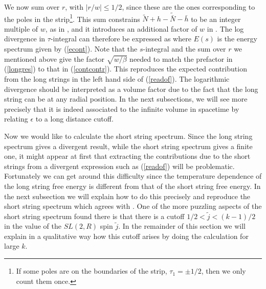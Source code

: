 We now sum over $r$, with $| r/w| \leq 1/2$, since these are the
ones corresponding to  the poles
in the strip\footnote{If some poles are on the boundaries of the strip,
  $\tau_1 = \pm 1/2$, then  we only
count them once. }. This sum constrains
$\tilde N+h- \tilde{\bar{N}}-\bar{h}$
  to be an integer  multiple of $w$, as in 
 \levelml , and  it introduces an additional factor
 of $w$ in \longres . The log divergence in
$\tau$-integral can therefore be expressed as
where $E(s)$ is the energy spectrum given by (\ref{econt}).
Note that the $s$-integral and the sum over $r$ we mentioned above 
 give the factor $\sqrt{w/\beta}$ needed
to match the prefactor
 in (\ref{longres}) to that 
in (\ref{contcontr}).   
This reproduces the expected contribution from the long strings 
in the left  hand side of
(\ref{readof}). The logarithmic divergence  should 
be interpreted as a volume factor due to the fact that the
long string can be at any radial position. In the next subsections, 
we will see more precisely that it is indeed associated to the 
infinite volume in spacetime by relating $\epsilon$ to a 
long distance cutoff.

 
Now we would like to calculate the short string spectrum.
Since the long string spectrum gives a divergent result, while the 
short string spectrum gives a finite one, it might appear at first that 
extracting the contributions due to the short strings from a divergent
expression such as (\ref{readof}) will be problematic.
Fortunately we can get around this difficulty since the
temperature dependence of the long string free energy is different
from that of the short string free energy.
In the next subsection we will explain how to do this precisely and 
reproduce the short string spectrum which agrees with 
\cite{Maldacena:2000hw}. One of the more
puzzling aspects of the short string spectrum found there is
that there is a cutoff $1/2 < \tilde{j} < (k-1)/2$
in the value of the $SL(2,R)$ spin $\tilde j$.
 In the remainder of this section we will explain in 
a qualitative way how this cutoff arises by doing the calculation for
large $k$.
 
